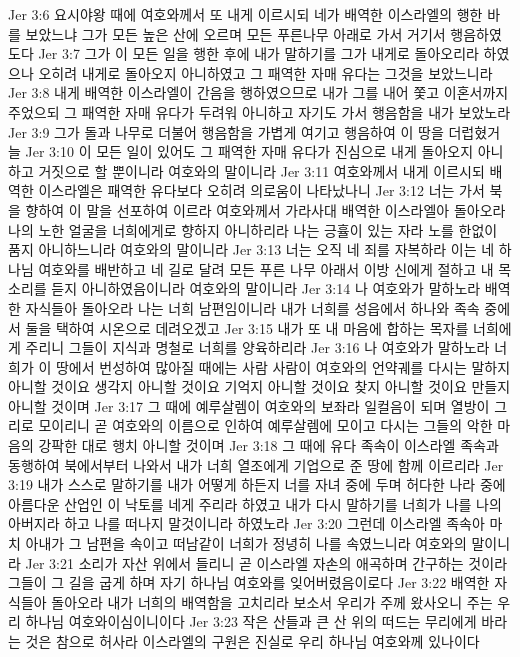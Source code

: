 Jer 3:6  요시야왕 때에 여호와께서 또 내게 이르시되 네가 배역한 이스라엘의 행한 바를 보았느냐 그가 모든 높은 산에 오르며 모든 푸른나무 아래로 가서 거기서 행음하였도다
Jer 3:7  그가 이 모든 일을 행한 후에 내가 말하기를 그가 내게로 돌아오리라 하였으나 오히려 내게로 돌아오지 아니하였고 그 패역한 자매 유다는 그것을 보았느니라
Jer 3:8  내게 배역한 이스라엘이 간음을 행하였으므로 내가 그를 내어 쫓고 이혼서까지 주었으되 그 패역한 자매 유다가 두려워 아니하고 자기도 가서 행음함을 내가 보았노라
Jer 3:9  그가 돌과 나무로 더불어 행음함을 가볍게 여기고 행음하여 이 땅을 더럽혔거늘
Jer 3:10  이 모든 일이 있어도 그 패역한 자매 유다가 진심으로 내게 돌아오지 아니하고 거짓으로 할 뿐이니라 여호와의 말이니라
Jer 3:11  여호와께서 내게 이르시되 배역한 이스라엘은 패역한 유다보다 오히려 의로움이 나타났나니
Jer 3:12  너는 가서 북을 향하여 이 말을 선포하여 이르라 여호와께서 가라사대 배역한 이스라엘아 돌아오라 나의 노한 얼굴을 너희에게로 향하지 아니하리라 나는 긍휼이 있는 자라 노를 한없이 품지 아니하느니라 여호와의 말이니라
Jer 3:13  너는 오직 네 죄를 자복하라 이는 네 하나님 여호와를 배반하고 네 길로 달려 모든 푸른 나무 아래서 이방 신에게 절하고 내 목소리를 듣지 아니하였음이니라 여호와의 말이니라
Jer 3:14  나 여호와가 말하노라 배역한 자식들아 돌아오라 나는 너희 남편임이니라 내가 너희를 성읍에서 하나와 족속 중에서 둘을 택하여 시온으로 데려오겠고
Jer 3:15  내가 또 내 마음에 합하는 목자를 너희에게 주리니 그들이 지식과 명철로 너희를 양육하리라
Jer 3:16  나 여호와가 말하노라 너희가 이 땅에서 번성하여 많아질 때에는 사람 사람이 여호와의 언약궤를 다시는 말하지 아니할 것이요 생각지 아니할 것이요 기억지 아니할 것이요 찾지 아니할 것이요 만들지 아니할 것이며
Jer 3:17  그 때에 예루살렘이 여호와의 보좌라 일컬음이 되며 열방이 그리로 모이리니 곧 여호와의 이름으로 인하여 예루살렘에 모이고 다시는 그들의 악한 마음의 강팍한 대로 행치 아니할 것이며
Jer 3:18  그 때에 유다 족속이 이스라엘 족속과 동행하여 북에서부터 나와서 내가 너희 열조에게 기업으로 준 땅에 함께 이르리라
Jer 3:19  내가 스스로 말하기를 내가 어떻게 하든지 너를 자녀 중에 두며 허다한 나라 중에 아름다운 산업인 이 낙토를 네게 주리라 하였고 내가 다시 말하기를 너희가 나를 나의 아버지라 하고 나를 떠나지 말것이니라 하였노라
Jer 3:20  그런데 이스라엘 족속아 마치 아내가 그 남편을 속이고 떠남같이 너희가 정녕히 나를 속였느니라 여호와의 말이니라
Jer 3:21  소리가 자산 위에서 들리니 곧 이스라엘 자손의 애곡하며 간구하는 것이라 그들이 그 길을 굽게 하며 자기 하나님 여호와를 잊어버렸음이로다
Jer 3:22  배역한 자식들아 돌아오라 내가 너희의 배역함을 고치리라 보소서 우리가 주께 왔사오니 주는 우리 하나님 여호와이심이니이다
Jer 3:23  작은 산들과 큰 산 위의 떠드는 무리에게 바라는 것은 참으로 허사라 이스라엘의 구원은 진실로 우리 하나님 여호와께 있나이다
